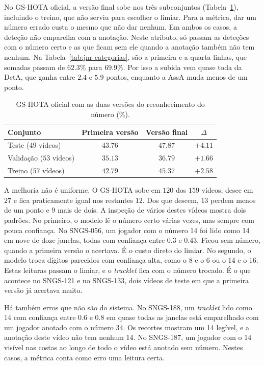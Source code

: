 No GS-HOTA oficial, a versão final sobe nos três subconjuntos (Tabela~\ref{tab:jnr-confianca-gshota}), incluindo o treino, que não serviu para escolher o limiar. Para a métrica, dar um número errado custa o mesmo que não dar nenhum. Em ambos os casos, a deteção não emparelha com a anotação. Neste atributo, só passam as deteções com o número certo e as que ficam sem ele quando a anotação também não tem nenhum. Na Tabela~\ref{tab:jnr-categorias}, são a primeira e a quarta linhas, que somadas passam de $62.3\%$ para $69.9\%$. Por isso a subida vem quase toda da DetA, que ganha entre $2.4$ e $5.9$ pontos, enquanto a AssA muda menos de um ponto.


\begin{table}[H]
    \centering
    \caption{GS-HOTA oficial com as duas versões do reconhecimento do número (\%).}
    \label{tab:jnr-confianca-gshota}
    \begin{tabular}{|l|c|c|c|}
        \hline
        \textbf{Conjunto} & \textbf{Primeira versão} & \textbf{Versão final} & \textbf{$\Delta$} \\
        \hline
        Teste ($49$ vídeos)     & $43.76$ & $47.87$ & $+4.11$ \\
        \hline
        Validação ($53$ vídeos) & $35.13$ & $36.79$ & $+1.66$ \\
        \hline
        Treino ($57$ vídeos)    & $42.79$ & $45.37$ & $+2.58$ \\
        \hline
    \end{tabular}
\end{table}


A melhoria não é uniforme. O GS-HOTA sobe em $120$ dos $159$ vídeos, desce em $27$ e fica praticamente igual nos restantes $12$. Dos que descem, $13$ perdem menos de um ponto e $9$ mais de dois. A inspeção de vários destes vídeos mostra dois padrões. No primeiro, o modelo lê o número certo várias vezes, mas sempre com pouca confiança. No SNGS-056, um jogador com o número 14 foi lido como 14 em nove de doze janelas, todas com confiança entre $0.3$ e $0.43$. Ficou sem número, quando a primeira versão o acertava. É o custo direto do limiar. No segundo, o modelo troca dígitos parecidos com confiança alta, como o 8 e o 6 ou o 14 e o 16. Estas leituras passam o limiar, e o \emph{tracklet} fica com o número trocado. É o que acontece no SNGS-121 e no SNGS-133, dois vídeos de teste em que a primeira versão já acertava muito.

Há também erros que não são do sistema. No SNGS-188, um \emph{tracklet} lido como 14 com confiança entre $0.6$ e $0.8$ em quase todas as janelas está emparelhado com um jogador anotado com o número 34. Os recortes mostram um 14 legível, e a anotação deste vídeo não tem nenhum 14. No SNGS-187, um jogador com o 14 visível nas costas ao longo de todo o vídeo está anotado sem número. Nestes casos, a métrica conta como erro uma leitura certa.

